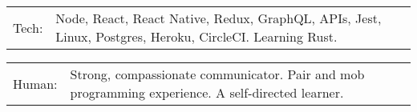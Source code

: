 \documentclass[10pt,a4paper]{article}
\newcommand{\tzlarrow}{(0,0) -- (0.2,0) -- (0.3,0.2) -- (0.2,0.4) -- (0,0.4) -- (0.1,0.2) -- cycle;}
\newcommand{\larrow}[1]
{\begin{tikzpicture}[scale=0.58]
	 \filldraw[fill=#1!100,draw=#1!100!black]  \tzlarrow
 \end{tikzpicture}
}
\newcommand{\metasection}[2]
{
\begin{tabular*}{1\textwidth}{p{2.4cm} p{14cm}}
\larrow{bgcol}	\normalsize{\textcolor{sectcol}{#1}}&#2\\[12pt]
\end{tabular*}
}
\begin{document}
\pagestyle{fancy}	


\vspace{-20.55pt}


\hspace{-0.25\linewidth}\colorbox{bgcol}{}



\vspace{12pt}

\metasection{Tech:}{Node, React, React Native, Redux, GraphQL, APIs, Jest, Linux, Postgres, Heroku, CircleCI. Learning Rust.}
\metasection{Human:}{Strong, compassionate communicator. Pair and mob programming experience. A self-directed learner.}

\vspace{6pt}

\end{document}
